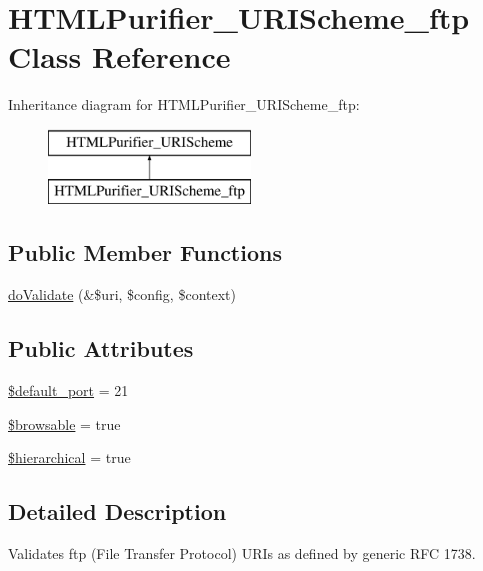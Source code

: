 \hypertarget{classHTMLPurifier__URIScheme__ftp}{\section{H\+T\+M\+L\+Purifier\+\_\+\+U\+R\+I\+Scheme\+\_\+ftp Class Reference}
\label{classHTMLPurifier__URIScheme__ftp}
}
Inheritance diagram for H\+T\+M\+L\+Purifier\+\_\+\+U\+R\+I\+Scheme\+\_\+ftp\+:\begin{figure}[H]
\begin{center}
\leavevmode
\includegraphics[height=2.000000cm]{classHTMLPurifier__URIScheme__ftp}
\end{center}
\end{figure}
\subsection*{Public Member Functions}
\begin{DoxyCompactItemize}
\item 
\hyperlink{classHTMLPurifier__URIScheme__ftp_abc119234c44f939a5ad5aa8e535685ac}{do\+Validate} (\&\$uri, \$config, \$context)
\end{DoxyCompactItemize}
\subsection*{Public Attributes}
\begin{DoxyCompactItemize}
\item 
\hyperlink{classHTMLPurifier__URIScheme__ftp_a48b8fe1052b83ee9c23987836f2e7d61}{\$default\+\_\+port} = 21
\item 
\hyperlink{classHTMLPurifier__URIScheme__ftp_ad18caa12518cda39b640d782c07204be}{\$browsable} = true
\item 
\hyperlink{classHTMLPurifier__URIScheme__ftp_aea2ab0dd4b2354db85c9d22608d149b3}{\$hierarchical} = true
\end{DoxyCompactItemize}


\subsection{Detailed Description}
Validates ftp (File Transfer Protocol) U\+R\+Is as defined by generic R\+F\+C 1738. 

